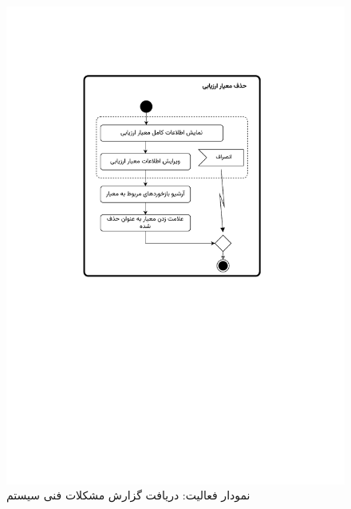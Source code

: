 \begin{figure}[ht!]
	\centering
	\includegraphics[scale=0.6, page=3]{figs/OOD-activity31-35.pdf}
	\caption{نمودار فعالیت: دریافت گزارش مشکلات فنی سیستم}
\end{figure}
\FloatBarrier
\newpage

